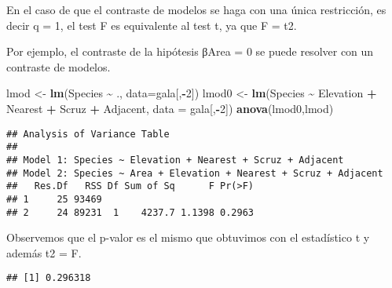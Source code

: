 \documentclass[
]{article}
\newenvironment{Shaded}{\begin{snugshade}}{\end{snugshade}}
\newcommand{\AttributeTok}[1]{\textcolor[rgb]{0.13,0.29,0.53}{#1}}
\newcommand{\CommentTok}[1]{\textcolor[rgb]{0.56,0.35,0.01}{\textit{#1}}}
\newcommand{\DecValTok}[1]{\textcolor[rgb]{0.00,0.00,0.81}{#1}}
\newcommand{\FunctionTok}[1]{\textcolor[rgb]{0.13,0.29,0.53}{\textbf{#1}}}
\newcommand{\NormalTok}[1]{#1}
\newcommand{\OtherTok}[1]{\textcolor[rgb]{0.56,0.35,0.01}{#1}}
\newcommand{\SpecialCharTok}[1]{\textcolor[rgb]{0.81,0.36,0.00}{\textbf{#1}}}
\begin{document}
En el caso de que el contraste de modelos se haga con una única
restricción, es decir q = 1, el test F es equivalente al test t, ya que
F = t2.

Por ejemplo, el contraste de la hipótesis βArea = 0 se puede resolver
con un contraste de modelos.

\begin{Shaded}
\begin{Highlighting}[]
\NormalTok{lmod }\OtherTok{\textless{}{-}} \FunctionTok{lm}\NormalTok{(Species }\SpecialCharTok{\textasciitilde{}}\NormalTok{ ., }\AttributeTok{data=}\NormalTok{gala[,}\SpecialCharTok{{-}}\DecValTok{2}\NormalTok{])}
\NormalTok{lmod0 }\OtherTok{\textless{}{-}} \FunctionTok{lm}\NormalTok{(Species }\SpecialCharTok{\textasciitilde{}}\NormalTok{ Elevation }\SpecialCharTok{+}\NormalTok{ Nearest }\SpecialCharTok{+}\NormalTok{ Scruz }\SpecialCharTok{+}\NormalTok{ Adjacent,}
\AttributeTok{data =}\NormalTok{ gala[,}\SpecialCharTok{{-}}\DecValTok{2}\NormalTok{])}
\FunctionTok{anova}\NormalTok{(lmod0,lmod)}
\end{Highlighting}
\end{Shaded}

\begin{verbatim}
## Analysis of Variance Table
## 
## Model 1: Species ~ Elevation + Nearest + Scruz + Adjacent
## Model 2: Species ~ Area + Elevation + Nearest + Scruz + Adjacent
##   Res.Df   RSS Df Sum of Sq      F Pr(>F)
## 1     25 93469                           
## 2     24 89231  1    4237.7 1.1398 0.2963
\end{verbatim}

Observemos que el p-valor es el mismo que obtuvimos con el estadístico t
y además t2 = F.

\begin{Shaded}
\end{Shaded}

\begin{verbatim}
## [1] 0.296318
\end{verbatim}

\begin{Shaded}
\end{Shaded}
\end{document}
